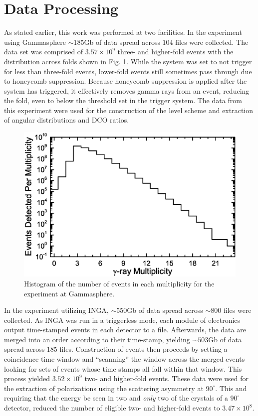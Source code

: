 \section{Data Processing}
\label{sec:exp-pr-data-proc}
 As stated earlier, this work was performed at two facilities. In the experiment using Gammasphere $\sim{}185$Gb of data spread across $104$ files were collected. The data set was comprised of $3.57\times{}10^9$ three- and higher-fold events with the distribution across folds shown in Fig. \ref{fig:chp3-gs_event_pattern}. While the system was set to not trigger for less than three-fold events, lower-fold events still sometimes pass through due to honeycomb suppression. Because honeycomb suppression is applied after the system has triggered, it effectively removes gamma rays from an event, reducing the fold, even to below the threshold set in the trigger system. The data from this experiment were used for the construction of the level scheme and extraction of angular distributions and DCO ratios.
 
\begin{figure}[h!]
	\centerline{\includegraphics[height=0.25\textheight]{./img/c3/gs_event_plot.eps}}
	\caption{Histogram of the number of events in each multiplicity for the experiment at Gammasphere.}
	\label{fig:chp3-gs_event_pattern}
\end{figure}
 
In the experiment utilizing INGA, $\sim{}550$Gb of data spread across $\sim800$ files were collected. As INGA was run in a triggerless mode, each module of electronics output time-stamped events in each detector to a file. Afterwards, the data are merged into an order according to their time-stamp, yielding $\sim{}503$Gb of data spread across $185$ files. Construction of events then proceeds by setting a coincidence time window and ``scanning'' the window across the merged events looking for sets of events whose time stamps all fall within that window. This process yielded $3.52\times{}10^9$ two- and higher-fold events. These data were used for the extraction of polarizations using the scattering asymmetry at $90^{\circ{}}$. This and requiring that the energy be seen in two and \emph{only} two of the crystals of a $90^{\circ{}}$ detector, reduced the number of eligible two- and higher-fold events to $3.47\times{}10^8$.
 
